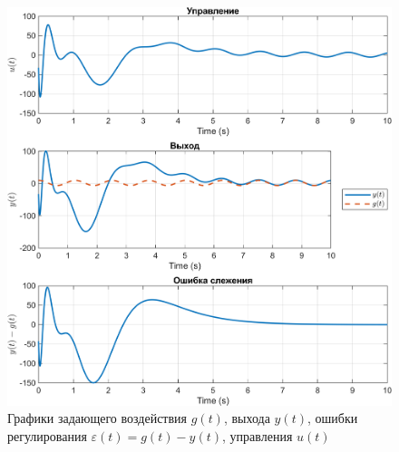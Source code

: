 \begin{figure}[H]
    \centering
    \includegraphics[width=\linewidth]{figs/1_1_0_sim.png}
    \caption{Графики задающего воздействия $g(t)$, выхода
    $y(t)$, ошибки регулирования $\varepsilon(t) = g(t) - y(t)$,
    управления $u(t)$}
    \label{fig:1_1_0_sim}
\end{figure}

